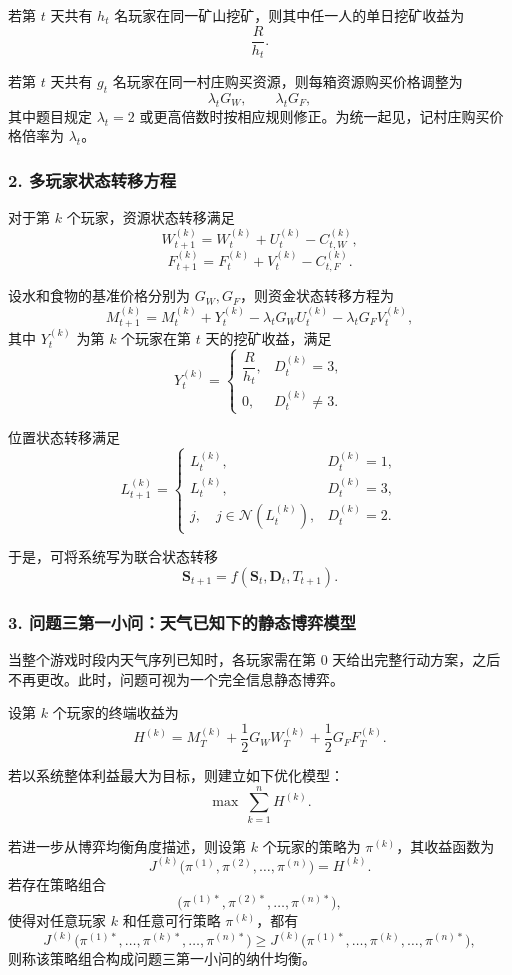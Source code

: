 \documentclass[UTF8,a4paper,12pt]{ctexart}
\begin{document}
若第 $t$ 天共有 $h_t$ 名玩家在同一矿山挖矿，则其中任一人的单日挖矿收益为
\[
\frac{R}{h_t}.
\]

若第 $t$ 天共有 $g_t$ 名玩家在同一村庄购买资源，则每箱资源购买价格调整为
\[
\lambda_t G_W,\qquad \lambda_t G_F,
\]
其中题目规定 $\lambda_t=2$ 或更高倍数时按相应规则修正。为统一起见，记村庄购买价格倍率为 $\lambda_t$。

\subsubsection*{2. 多玩家状态转移方程}

对于第 $k$ 个玩家，资源状态转移满足
\[
W_{t+1}^{(k)}=W_t^{(k)}+U_t^{(k)}-C_{t,W}^{(k)},
\]
\[
F_{t+1}^{(k)}=F_t^{(k)}+V_t^{(k)}-C_{t,F}^{(k)}.
\]

设水和食物的基准价格分别为 $G_W,G_F$，则资金状态转移方程为
\[
M_{t+1}^{(k)}
=
M_t^{(k)}
+Y_t^{(k)}
-\lambda_t G_W U_t^{(k)}
-\lambda_t G_F V_t^{(k)},
\]
其中 $Y_t^{(k)}$ 为第 $k$ 个玩家在第 $t$ 天的挖矿收益，满足
\[
Y_t^{(k)}=
\begin{cases}
\dfrac{R}{h_t}, & D_t^{(k)}=3,\\[6pt]
0, & D_t^{(k)}\neq 3.
\end{cases}
\]

位置状态转移满足
\[
L_{t+1}^{(k)}=
\begin{cases}
L_t^{(k)}, & D_t^{(k)}=1,\\
L_t^{(k)}, & D_t^{(k)}=3,\\
j,\quad j\in\mathcal{N}(L_t^{(k)}), & D_t^{(k)}=2.
\end{cases}
\]

于是，可将系统写为联合状态转移
\[
\mathbf{S}_{t+1}=f(\mathbf{S}_t,\mathbf{D}_t,T_{t+1}).
\]

\subsubsection*{3. 问题三第一小问：天气已知下的静态博弈模型}

当整个游戏时段内天气序列已知时，各玩家需在第 $0$ 天给出完整行动方案，之后不再更改。此时，问题可视为一个完全信息静态博弈。

设第 $k$ 个玩家的终端收益为
\[
H^{(k)}=M_T^{(k)}+\frac12 G_W W_T^{(k)}+\frac12 G_F F_T^{(k)}.
\]

若以系统整体利益最大为目标，则建立如下优化模型：
\[
\max \ \sum_{k=1}^{n} H^{(k)}.
\]

若进一步从博弈均衡角度描述，则设第 $k$ 个玩家的策略为 $\pi^{(k)}$，其收益函数为
\[
J^{(k)}\bigl(\pi^{(1)},\pi^{(2)},\dots,\pi^{(n)}\bigr)=H^{(k)}.
\]
若存在策略组合
\[
\bigl(\pi^{(1)*},\pi^{(2)*},\dots,\pi^{(n)*}\bigr),
\]
使得对任意玩家 $k$ 和任意可行策略 $\pi^{(k)}$，都有
\[
J^{(k)}\bigl(\pi^{(1)*},\dots,\pi^{(k)*},\dots,\pi^{(n)*}\bigr)
\ge
J^{(k)}\bigl(\pi^{(1)*},\dots,\pi^{(k)},\dots,\pi^{(n)*}\bigr),
\]
则称该策略组合构成问题三第一小问的纳什均衡。
\end{document}
